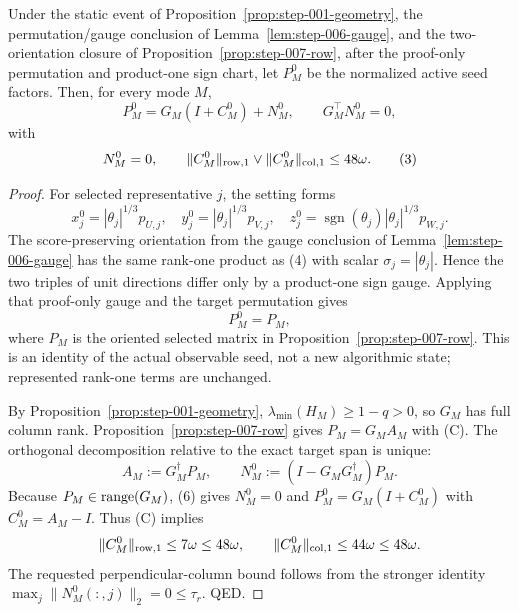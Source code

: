 \begin{lemma}\label{lem:step-008-seed-decomp}
Under the static event of Proposition~\ref{prop:step-001-geometry}, the
permutation/gauge conclusion of Lemma~\ref{lem:step-006-gauge}, and the
two-orientation closure of Proposition~\ref{prop:step-007-row}, after the
proof-only permutation and product-one sign chart, let $P_M^0$ be the
normalized active seed factors. Then, for every mode $M$,
\[
 P_M^0=G_M(I+C_M^0)+N_M^0,\qquad G_M^\top N_M^0=0, \tag{2}
\]
with
\[
 N_M^0=0,\qquad
 \|C_M^0\|_{\rm row,1}\vee\|C_M^0\|_{\rm col,1}\le48\omega. \tag{3}
\]

\begin{proof}

For selected representative $j$, the setting forms
\[
 x_j^0=|\theta_j|^{1/3}p_{U,j},\quad
 y_j^0=|\theta_j|^{1/3}p_{V,j},\quad
 z_j^0=\operatorname{sgn}(\theta_j)|\theta_j|^{1/3}p_{W,j}. \tag{4}
\]
The score-preserving orientation from the gauge conclusion of Lemma~\ref{lem:step-006-gauge} has the same rank-one product
as (4) with scalar $\sigma_j=|\theta_j|$. Hence the two triples of unit
directions differ only by a product-one sign gauge. Applying that proof-only
gauge and the target permutation gives
\[
 P_M^0=P_M, \tag{5}
\]
where $P_M$ is the oriented selected matrix in Proposition~\ref{prop:step-007-row}.
This is an identity of the actual observable seed, not a new
algorithmic state; represented rank-one terms are unchanged.

By Proposition~\ref{prop:step-001-geometry}, $\lambda_{\min}(H_M)\ge1-q>0$,
so $G_M$ has full column rank. Proposition~\ref{prop:step-007-row} gives
$P_M=G_MA_M$ with (C). The orthogonal
decomposition relative to the exact target span is unique:
\[
 A_M:=G_M^\dagger P_M,\qquad
 N_M^0:=(I-G_MG_M^\dagger)P_M. \tag{6}
\]
Because $P_M\in{\rm range}(G_M)$, (6) gives $N_M^0=0$ and
$P_M^0=G_M(I+C_M^0)$ with $C_M^0=A_M-I$. Thus (C) implies
\[
 \|C_M^0\|_{\rm row,1}\le7\omega\le48\omega,\qquad
 \|C_M^0\|_{\rm col,1}\le44\omega\le48\omega.
\]
The requested perpendicular-column bound follows from the stronger identity
$\max_j\|N_M^0(:,j)\|_2=0\le\tau_r$. QED.


\end{proof}
\end{lemma}
